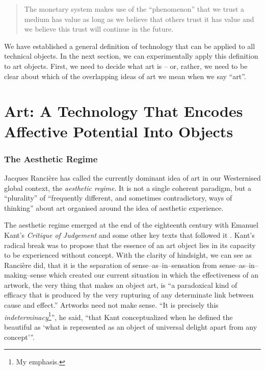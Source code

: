 \documentclass[letter:wpaper]{article}
\begin{document}
    \begin{quote}
        The monetary system makes use of the “phenomenon” that we trust a medium has value as long as we believe that others trust it has value and we believe this trust will continue in the future. \citep[p.55]{theNatureOfTechnology2009}
    \end{quote}

    We have established a general definition of technology that can be applied to all technical objects. In the next section, we can experimentally apply this definition to art objects. First, we need to decide what art is – or, rather, we need to be clear about which of the overlapping ideas of art we mean when we say “art”.

\section{Art: A Technology That Encodes Affective Potential Into Objects}

    \subsubsection{The Aesthetic Regime}

    Jacques Rancière has called the currently dominant idea of art in our Westernised global context, the \emph{aesthetic regime}. It is not a single coherent paradigm, but a “plurality” of “frequently different, and sometimes contradictory, ways of thinking” \citep[p.8]{RanciereMdrnTms2022} about art organised around the idea of aesthetic experience.
    
    The aesthetic regime emerged at the end of the eighteenth century with Emanuel Kant's \emph{Critique of Judgement} and some other key texts that followed it \citep[pp.23–24]{RancierPltcsOfThAsthtcs2004}. Kant's radical break was to propose that the essence of an art object lies in its capacity to be experienced without concept. With the clarity of hindsight, we can see as Rancière did, that it is the separation of sense–as–in–sensation from sense–as–in–making–sense which created our current situation in which the effectiveness of an artwork, the very thing that makes an object art, is “a paradoxical kind of efficacy that is produced by the very rupturing of any determinate link between cause and effect.” Artworks need not make sense. “It is precisely this \emph{indeterminacy}\footnote{
        My emphasis.
    }”, he said, “that Kant conceptualized when he defined the beautiful as ‘what is represented as an object of universal delight apart from any concept’”. \citep[p.51-52]{RancierThEmncptdSpcttr2009}
\end{document}
